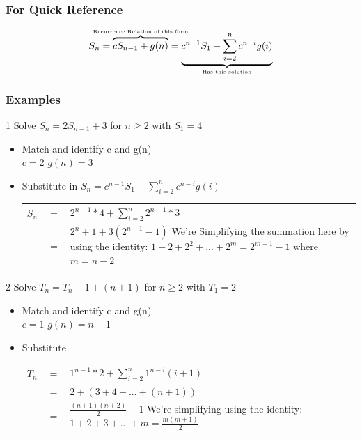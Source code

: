 \documentclass[12pt, letterpaper]{article}
\newcommand{\exheader}[1][ex]{{\tiny{#1}\normalsize}}
\begin{document}
\subsubsection*{For Quick Reference}
\[ S_n =  \overbrace{cS_{n-1} + g(n)}^{\makebox[0pt]{\tiny Recurrence Relation of this form}}  = \underbrace{c^{n-1} S_1 +  \sum_{i=2}^{n} c^{n-i} g(i)}_{\makebox[0pt]{\tiny Has this solution}} \]
\normalsize

\pagebreak

\subsubsection*{Examples}

\exheader[1] Solve $S_n = 2S_{n-1} + 3$ for $n \ge 2$  with $S_1 = 4$
\begin{itemize}[leftmargin=*, label={}]
	\item Match and identify c and g(n) \\ $c=2$ \quad $g(n) = 3$
	\item Substitute in $S_n = c^{n-1} S_1 + \sum_{i=2}^{n} c^{n-i} g(i)$ \\
	\begin{tabular}{l l l}
		$S_n$ & $=$ & $2^{n-1} * 4 + \sum_{i=2}^{n} 2^{n-1} * 3$ \\
		& $=$ & $2^n+1 + 3(2^{n-1} -1)$ {\tiny We're Simplifying the summation here by using the identity: $1+2+2^2+...+2^m = 2^{m+1} -1$ where $m = n-2$}
	\end{tabular}
\end{itemize}

\bigbreak

\exheader[2] Solve $T_n = T_n-1 + (n+1)$ for $n \ge 2$ with $T_1 = 2$
\begin{itemize}[leftmargin=*, label={}]
	\item Match and identify c and g(n) \\ $c=1$ \quad $g(n) = n+1$
	\item Substitute \\
	\begin{tabular}{l l l}
		$T_n$ & $=$ & $1^{n-1} * 2 + \sum_{i=2}^{n} 1^{n-i} (i +1)$ \\
		& $=$ & $2 + (3+4+...+(n+1))$ \\
		& $=$ & $\frac{(n+1)(n+2)}{2} -1$ {\tiny We're simplifying using the identity: $1+2+3+...+m = \frac{m(m+1)}{2}$}
	\end{tabular}
\end{itemize}


\pagebreak
\end{document}
